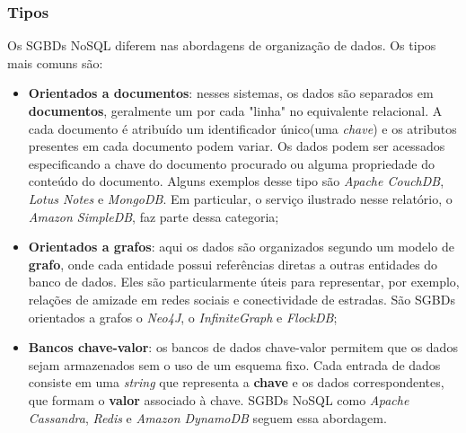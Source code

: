 \subsubsection{Tipos}
	Os SGBDs NoSQL diferem nas abordagens de organização de dados. Os tipos mais comuns são:\\
	\begin{itemize}
		\item
		\textbf{Orientados a documentos}: nesses sistemas, os dados são separados em \textbf{documentos}, geralmente um por cada "linha" no equivalente relacional. A cada documento é atribuído um identificador único(uma \textit{chave}) e os atributos presentes em cada documento podem variar. Os dados podem ser acessados especificando a chave do documento procurado ou alguma propriedade do conteúdo do documento. Alguns exemplos desse tipo são \textit{Apache CouchDB}, \textit{Lotus Notes} e \textit{MongoDB}. Em particular, o serviço ilustrado nesse relatório, o \textit{Amazon SimpleDB}, faz parte dessa categoria; \\
		\item
		\textbf{Orientados a grafos}: aqui os dados são organizados segundo um modelo de \textbf{grafo}, onde cada entidade possui referências diretas a outras entidades do banco de dados. Eles são particularmente úteis para representar, por exemplo, relações de amizade em redes sociais e conectividade de estradas. São SGBDs orientados a grafos o \textit{Neo4J}, o \textit{InfiniteGraph} e \textit{FlockDB}; \\
		\item
		\textbf{Bancos chave-valor}: os bancos de dados chave-valor permitem que os dados sejam armazenados sem o uso de um esquema fixo. Cada entrada de dados consiste em uma \textit{string} que representa a \textbf{chave} e os dados correspondentes, que formam o \textbf{valor} associado à chave. SGBDs NoSQL como \textit{Apache Cassandra}, \textit{Redis} e \textit{Amazon DynamoDB} seguem essa abordagem.\\
	\end{itemize}
